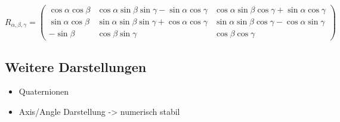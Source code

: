 \begin{equation}
R_{\alpha, \beta, \gamma} %
=
\left(
\begin{array}{ccc}
\cos{\alpha}\cos{\beta} & \cos{\alpha}\sin{\beta}\sin{\gamma} - \sin{\alpha}\cos{\gamma}  & \cos{\alpha}\sin{\beta}\cos{\gamma} + \sin{\alpha}\cos{\gamma} \\
\sin{\alpha}\cos{\beta} & \sin{\alpha}\sin{\beta}\sin{\gamma} + \cos{\alpha}\cos{\gamma} & \sin{\alpha}\sin{\beta}\cos{\gamma} - \cos{\alpha}\sin{\gamma}  \\
-\sin{\beta}	   & \cos{\beta}\sin{\gamma}    &   \cos{\beta}\cos{\gamma}
\end{array}
\right)	
\end{equation}


\subsection{Weitere Darstellungen}
\begin{itemize}
	\item Quaternionen \cite{quaternionen}
	\item Axis/Angle Darstellung \cite{axis-angle} -> numerisch stabil
\end{itemize}